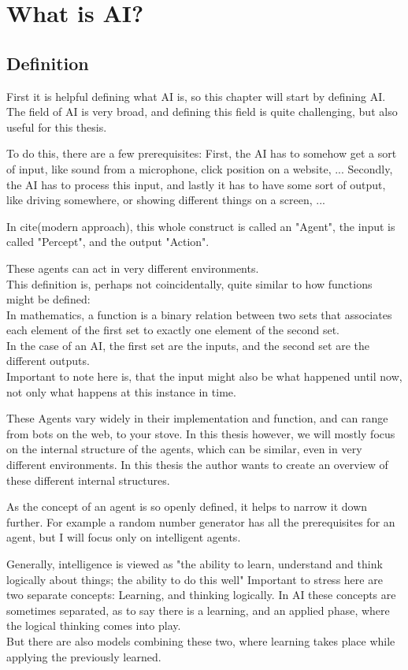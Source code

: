 \chapter{What is AI?}
\section{Definition}
First it is helpful defining what AI is, so this chapter will start by defining AI.
The field of AI is very broad, and defining this field is quite challenging, but also useful for this thesis. 

To do this, there are a few prerequisites: 
First, the AI has to somehow get a sort of input, like sound from a microphone, click position on a website, ... 
Secondly, the AI has to process this input, 
and lastly it has to have some sort of output, like driving somewhere, or showing different things on a screen, ... 

In cite(modern approach), this whole construct is called an "Agent", the input is called "Percept", and the output "Action".

These agents can act in very different environments.\\This definition is, perhaps not coincidentally, quite similar to how functions might be defined: \\In mathematics, a function is a binary relation between two sets that associates each element of the first set to exactly one element of the second set. 
\\In the case of an AI, the first set are the inputs, and the second set are the different outputs. \\Important to note here is, that the input might also be what happened until now, not only what happens at this instance in time. 

These Agents vary widely in their implementation and function, and can range from bots on the web, to your stove. In this thesis however, we will mostly focus on the internal structure of the agents, which can be similar, even in very different environments.
In this thesis the author wants to create an overview of these different internal structures.

As the concept of an agent is so openly defined, it helps to narrow it down further. For example a random number generator has all the prerequisites for an agent, but I will focus only on intelligent agents.

Generally, intelligence is viewed as "the ability to learn, understand and think logically about things; the ability to do this well" 
Important to stress here are two separate concepts: Learning, and thinking logically.
In AI these concepts are sometimes separated, as to say there is a learning, and an applied phase, where the logical thinking comes into play. \\But there are also models combining these two, where learning takes place while applying the previously learned.

